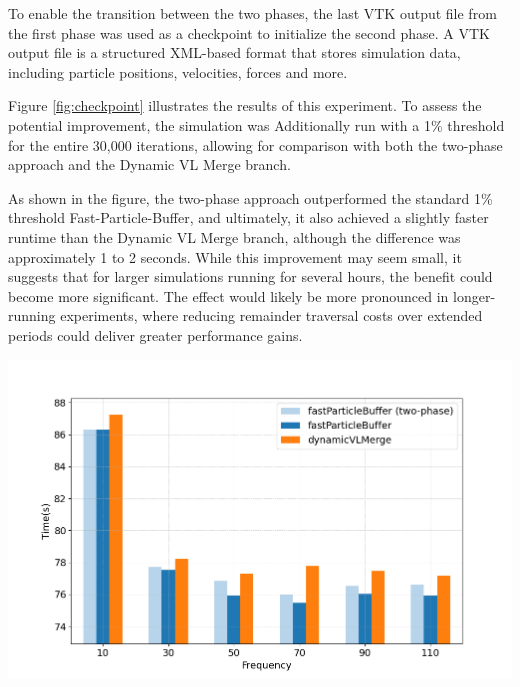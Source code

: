 To enable the transition between the two phases, the last VTK output file from the first phase was used as a checkpoint to initialize the second phase. A VTK output file is a structured XML-based format that stores simulation data, including particle positions, velocities, forces and more.

Figure \ref{fig:checkpoint} illustrates the results of this experiment. To assess the potential improvement, the simulation was Additionally run with a 1\% threshold for the entire 30,000 iterations, allowing for comparison with both the two-phase approach and the Dynamic VL Merge branch.  

As shown in the figure, the two-phase approach outperformed the standard 1\% threshold Fast-Particle-Buffer, and ultimately, it also achieved a slightly faster runtime than the Dynamic VL Merge branch, although the difference was approximately 1 to 2 seconds. While this improvement may seem small, it suggests that for larger simulations running for several hours, the benefit could become more significant. The effect would likely be more pronounced in longer-running experiments, where reducing remainder traversal costs over extended periods could deliver greater performance gains.

\begin{center}
    \includegraphics[width=0.8\linewidth]{graphs/checkpoint.png}
    \captionsetup{hypcap=false}
    \label{fig:checkpoint}
\end{center}


